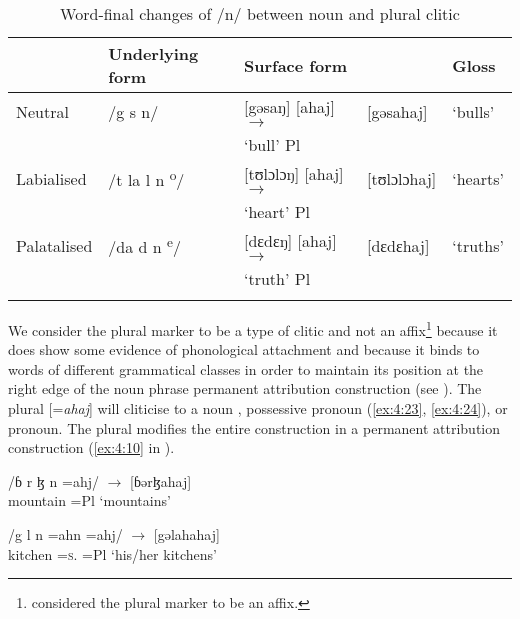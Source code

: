 \begin{table}
{\begin{tabular}{lllll}
\lsptoprule
& {Underlying form} & {Surface form} & &  {Gloss}\\\midrule
{Neutral } & /g s n/ & [gəsaŋ]   [ahaj] \hspace{5pt}  $\rightarrow$  & [gəsahaj] & ‘bulls’\\
& & ‘bull’  \hspace{8pt}  Pl \\
{Labialised} & /t la l n \textsuperscript{o}/ & [tʊlɔlɔŋ] [ahaj] \hspace{3pt}  $\rightarrow$  & [tʊlɔlɔhaj] & ‘hearts’\\
& & ‘heart’ \hspace{8pt} Pl  \\
{Palatalised} & /da d n \textsuperscript{e}/ & [dɛdɛŋ]   [ahaj] \hspace{5pt}  $\rightarrow$ & [dɛdɛhaj] & ‘truths’\\
& & ‘truth’ \hspace{5pt}  Pl \\
\lspbottomrule
\end{tabular}}
\caption{Word-final changes of /n/ between noun and plural clitic}\label{tab:28}
\end{table}

We consider the plural marker to be a type of clitic and not an affix\footnote{\citet{Bow1997c} considered the plural marker to be an affix. } because it does show some evidence of phonological attachment and because it binds to words of different grammatical classes in order to maintain its position at the right edge of the noun phrase permanent attribution construction (see ). The plural  [=\textit{ahaj}] will cliticise to a noun , possessive pronoun (\ref{ex:4:23}, \ref{ex:4:24}), or pronoun.  The plural modifies the entire construction in a permanent attribution construction (\ref{ex:4:10} in ). 

\ea \label{ex:4:22}
\textup{/ɓ r ɮ n \hspace{7pt} =ahj/     \hspace{36pt}   $\rightarrow$ \hspace{10pt}  [ɓərɮahaj]}\\
\glt  mountain     =Pl   \hspace{71pt}       ‘mountains’
\z

\ea \label{ex:4:23}
\textup{/g l n  \hspace{10pt}      =ahn    \hspace{12pt}      =ahj/  \hspace{3pt}  $\rightarrow$  \hspace{10pt} [gəlahahaj]}\\
\glt  kitchen  {}   =\textsc{s}.{\POSS}     =Pl  \hspace{38pt}    ‘his/her kitchens’
\z

